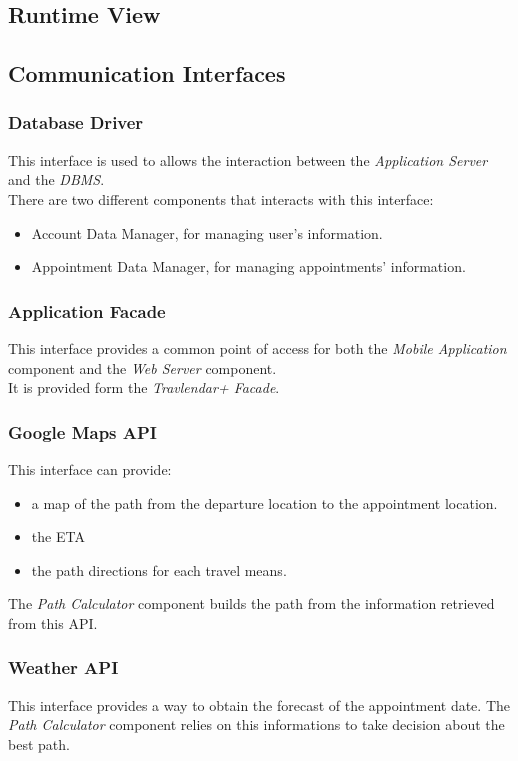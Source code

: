 \clearpage
\subsection{Runtime View}

\clearpage
\subsection{Communication Interfaces}
\subsubsection{Database Driver}
This interface is used to allows the interaction between the \emph{Application Server} and the \emph{DBMS}.\\
There are two different components that interacts with this interface:
\begin{itemize}
	\item Account Data Manager, for managing user's information.
	\item Appointment Data Manager, for managing appointments' information.
\end{itemize}

\subsubsection{Application Facade}
This interface provides a common point of access for both the \emph{Mobile Application} component and the \emph{Web Server} component.\\
It is provided form the \emph{Travlendar+ Facade}.

\subsubsection{Google Maps API}
This interface can provide:
\begin{itemize}
	\item a map of the path from the departure location to the appointment location.
	\item the ETA
	\item the path directions for each travel means.
\end{itemize}
The \emph{Path Calculator} component builds the path from the information retrieved from this API.

\subsubsection{Weather API}
This interface provides a way to obtain the forecast of the appointment date.
The \emph{Path Calculator} component relies on this informations to take decision about the best path.

